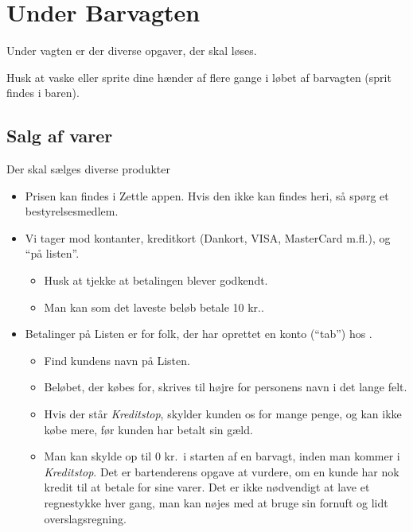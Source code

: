 \section{Under Barvagten}
\label{sec:intra-barvagten}

Under vagten er der diverse opgaver, der skal løses.

Husk at vaske eller sprite dine hænder af flere gange i løbet af barvagten (sprit findes i baren).

\subsection{Salg af varer}
\label{sec:intra:salg}

Der skal sælges diverse produkter
\begin{itemize}
    \item Prisen kan findes i Zettle appen. Hvis den ikke kan findes heri, så spørg et bestyrelsesmedlem.
    \item Vi tager mod kontanter, kreditkort (Dankort, VISA, MasterCard
    m.fl.), og ``på listen''.
    \begin{itemize}
        \item Husk at tjekke at betalingen blever godkendt.
        \item Man kan som det laveste beløb betale 10 kr..
    \end{itemize}
    \item Betalinger på Listen er for folk, der har oprettet en konto
    (``tab'') hos \fredagscafeen.
    \begin{itemize}
        \item Find kundens navn på Listen.
        \item Beløbet, der købes for, skrives til højre for personens navn
        i det lange felt.
        \item Hvis der står \emph{Kreditstop}, skylder kunden os for mange
        penge, og kan ikke købe mere, før kunden har betalt sin gæld.
        \item Man kan skylde op til 0 kr.\ i starten af en barvagt, inden
        man kommer i \emph{Kreditstop}. Det er bartenderens opgave at vurdere,
        om en kunde har nok kredit til at betale for sine varer.
        Det er ikke nødvendigt at lave et regnestykke hver gang, man kan nøjes
        med at bruge sin fornuft og lidt overslagsregning.

\end{itemize}
\end{itemize}
